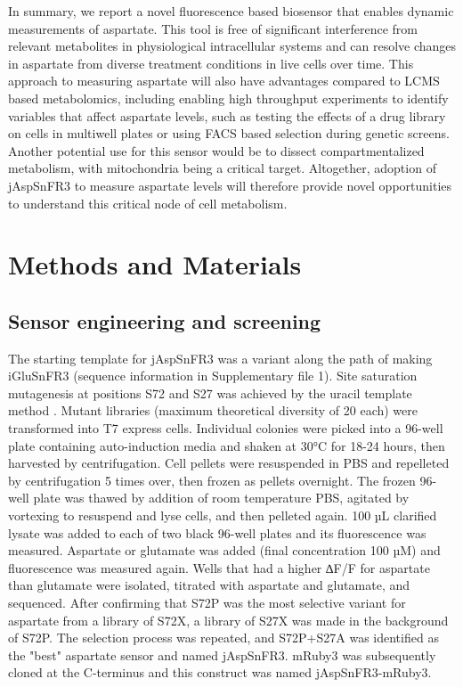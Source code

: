 \documentclass[9pt,lineno]{elife}
\begin{document}
In summary, we report a novel fluorescence based biosensor that enables dynamic measurements of aspartate.
This tool is free of significant interference from relevant metabolites in physiological intracellular systems and can resolve changes in aspartate from diverse treatment conditions in live cells over time.
This approach to measuring aspartate will also have advantages compared to LCMS based metabolomics, including enabling high throughput experiments to identify variables that affect aspartate levels, such as testing the effects of a drug library on cells in multiwell plates or using FACS based selection during genetic screens.
Another potential use for this sensor would be to dissect compartmentalized metabolism, with mitochondria being a critical target.
Altogether, adoption of jAspSnFR3 to measure aspartate levels will therefore provide novel opportunities to understand this critical node of cell metabolism.



\section{Methods and Materials}

\subsection{Sensor engineering and screening}
The starting template for jAspSnFR3 was a variant along the path of making iGluSnFR3 (sequence information in Supplementary file 1).
Site saturation mutagenesis at positions S72 and S27 was achieved by the uracil template method \citep{Kunkel1985-ev}.
Mutant libraries (maximum theoretical diversity of 20 each) were transformed into T7 express cells.
Individual colonies were picked into a 96-well plate containing auto-induction media \citep{Studier2005-ki} and shaken at 30°C for 18-24 hours, then harvested by centrifugation.
Cell pellets were resuspended in PBS and repelleted by centrifugation 5 times over, then frozen as pellets overnight.
The frozen 96-well plate was thawed by addition of room temperature PBS, agitated by vortexing to resuspend and lyse cells, and then pelleted again.
100 µL clarified lysate was added to each of two black 96-well plates and its fluorescence was measured.
Aspartate or glutamate was added (final concentration 100 µM) and fluorescence was measured again.
Wells that had a higher ∆F/F for aspartate than glutamate were isolated, titrated with aspartate and glutamate, and sequenced.
After confirming that S72P was the most selective variant for aspartate from a library of S72X, a library of S27X was made in the background of S72P.
The selection process was repeated, and S72P+S27A was identified as the "best" aspartate sensor and named jAspSnFR3.
mRuby3 was subsequently cloned at the C-terminus and this construct was named jAspSnFR3-mRuby3.
\end{document}
